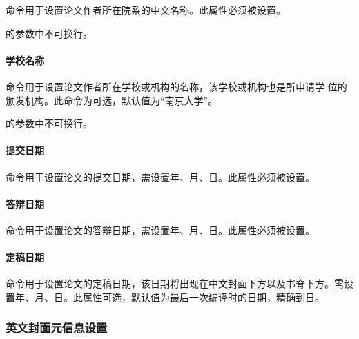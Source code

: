 命令用于设置论文作者所在院系的中文名称。此属性必须被设置。
\begin{tex}
\end{tex}
\begin{note}
的参数中不可换行。
\end{note}

\paragraph{学校名称}

命令用于设置论文作者所在学校或机构的名称，该学校或机构也是所申请学
位的颁发机构。此命令为可选，默认值为``南京大学''。
\begin{tex}
\end{tex}
\begin{note}
的参数中不可换行。
\end{note}

\paragraph{提交日期}

命令用于设置论文的提交日期，需设置年、月、日。此属性必须被设置。
\begin{tex}
\end{tex}

\paragraph{答辩日期}

命令用于设置论文的答辩日期，需设置年、月、日。此属性必须被设置。
\begin{tex}
\end{tex}

\paragraph{定稿日期}

命令用于设置论文的定稿日期，该日期将出现在中文封面下方以及书脊下方。需设
置年、月、日。此属性可选，默认值为最后一次编译时的日期，精确到日。
\begin{tex}
\date{2013年5月27日}
\end{tex}

\subsubsection{英文封面元信息设置}

